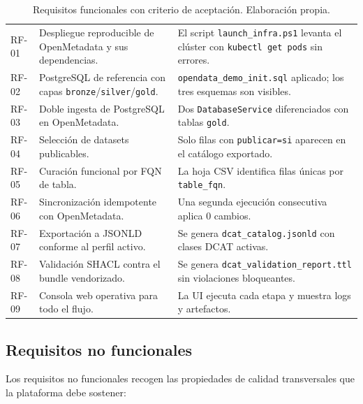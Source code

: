 \begin{table}[ht]
\footnotesize
\centering
\renewcommand{\arraystretch}{1.05}
\begin{tabular}{|L{1.1cm}|L{5.2cm}|L{6.2cm}|}
\hline
{}
 &  &  \\ \hline
RF-01 & Despliegue reproducible de OpenMetadata y sus dependencias. & El script \texttt{launch\_infra.ps1} levanta el clúster con \texttt{kubectl get pods} sin errores. \\ \hline
RF-02 & PostgreSQL de referencia con capas \texttt{bronze}/\texttt{silver}/\texttt{gold}. & \texttt{opendata\_demo\_init.sql} aplicado; los tres esquemas son visibles. \\ \hline
RF-03 & Doble ingesta de PostgreSQL en OpenMetadata. & Dos \texttt{DatabaseService} diferenciados con tablas \texttt{gold}. \\ \hline
RF-04 & Selección de datasets publicables. & Solo filas con \texttt{publicar=si} aparecen en el catálogo exportado. \\ \hline
RF-05 & Curación funcional por \ac{FQN} de tabla. & La hoja \ac{CSV} identifica filas únicas por \texttt{table\_fqn}. \\ \hline
RF-06 & Sincronización idempotente con OpenMetadata. & Una segunda ejecución consecutiva aplica 0 cambios. \\ \hline
RF-07 & Exportación a \ac{JSONLD} conforme al perfil activo. & Se genera \texttt{dcat\_catalog.jsonld} con clases \ac{DCAT} activas. \\ \hline
RF-08 & Validación \ac{SHACL} contra el bundle vendorizado. & Se genera \texttt{dcat\_validation\_report.ttl} sin violaciones bloqueantes. \\ \hline
RF-09 & Consola web operativa para todo el flujo. & La \ac{UI} ejecuta cada etapa y muestra logs y artefactos. \\ \hline
\end{tabular}
\caption{Requisitos funcionales con criterio de aceptación. Elaboración propia.}
\label{tab:requisitos-funcionales}
\end{table}
\FloatBarrier

\subsection{Requisitos no funcionales}\label{sec:requisitos-no-funcionales}

Los requisitos no funcionales recogen las propiedades de calidad transversales que la plataforma debe sostener:

